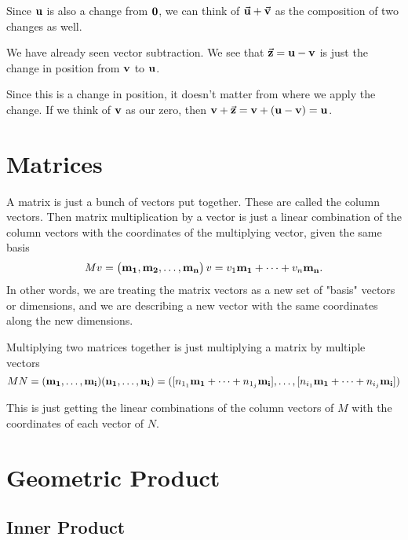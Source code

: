 \documentclass[../main.tex]{subfiles}
\begin{document}
\noindent


Since \( \vb{u} \) is also a change from \( \vb{0} \),
we can think of \( \va u + \va v \) as the composition of two changes as well.

We have already seen vector subtraction.
We see that \( \va{z} = \vb{u} - \vb{v} \)
is just the change in position from \( \vb{v} \) to \( \vb{u} \).

\noindent


Since this is a change in position,
it doesn't matter from where we apply the change.
If we think of \( \vb{v} \) as our zero,
then \( \vb v + \va z = \vb v + ( \vb u - \vb v ) = \vb u \).

\section{Matrices}

A matrix is just a bunch of vectors put together.
These are called the column vectors.
Then matrix multiplication by a vector is just a linear combination of the column vectors
with the coordinates of the multiplying vector, given the same basis
\[ Mv = 
    \begin{pmatrix}
    \vb{m_1}, \vb{m_2}, \dots, \vb{m_n}
    \end{pmatrix}
    v
    = v_1 \vb{m_1} + \dots + v_n \vb{m_n}.
\]
In other words,
we are treating the matrix vectors as a new set of "basis" vectors or dimensions,
and we are describing a new vector with the same coordinates along the new dimensions.

\noindent


Multiplying two matrices together is just multiplying a matrix by multiple vectors
\[ MN = (\vb{m_1}, \dots, \vb{m_i})(\vb{n_1}, \dots, \vb{n_i})
    = ([n_{1_1} \vb{m_1} + \dots + n_{1_j} \vb{m_i}], \dots, 
       [n_{i_1} \vb{m_1} + \dots + n_{i_j} \vb{m_i}])
\]

This is just getting the linear combinations of the column vectors of \( M \)
with the coordinates of each vector of \( N \). 


\section{Geometric Product}

\subsection{Inner Product}
\end{document}
